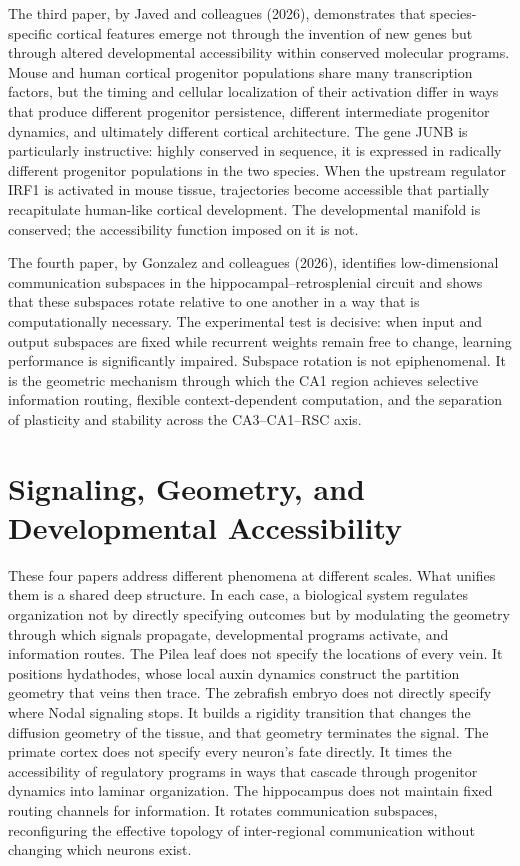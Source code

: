 \documentclass[12pt, a4paper, openany]{book}
\theoremstyle{definition}
\theoremstyle{remark}
\begin{document}
The third paper, by Javed and colleagues (2026), demonstrates that species-specific cortical features emerge not through the invention of new genes but through altered developmental accessibility within conserved molecular programs. Mouse and human cortical progenitor populations share many transcription factors, but the timing and cellular localization of their activation differ in ways that produce different progenitor persistence, different intermediate progenitor dynamics, and ultimately different cortical architecture. The gene JUNB is particularly instructive: highly conserved in sequence, it is expressed in radically different progenitor populations in the two species. When the upstream regulator IRF1 is activated in mouse tissue, trajectories become accessible that partially recapitulate human-like cortical development. The developmental manifold is conserved; the accessibility function imposed on it is not.

The fourth paper, by Gonzalez and colleagues (2026), identifies low-dimensional communication subspaces in the hippocampal--retrosplenial circuit and shows that these subspaces rotate relative to one another in a way that is computationally necessary. The experimental test is decisive: when input and output subspaces are fixed while recurrent weights remain free to change, learning performance is significantly impaired. Subspace rotation is not epiphenomenal. It is the geometric mechanism through which the CA1 region achieves selective information routing, flexible context-dependent computation, and the separation of plasticity and stability across the CA3--CA1--RSC axis.

\section*{Signaling, Geometry, and Developmental Accessibility}

These four papers address different phenomena at different scales. What unifies them is a shared deep structure. In each case, a biological system regulates organization not by directly specifying outcomes but by modulating the geometry through which signals propagate, developmental programs activate, and information routes. The Pilea leaf does not specify the locations of every vein. It positions hydathodes, whose local auxin dynamics construct the partition geometry that veins then trace. The zebrafish embryo does not directly specify where Nodal signaling stops. It builds a rigidity transition that changes the diffusion geometry of the tissue, and that geometry terminates the signal. The primate cortex does not specify every neuron's fate directly. It times the accessibility of regulatory programs in ways that cascade through progenitor dynamics into laminar organization. The hippocampus does not maintain fixed routing channels for information. It rotates communication subspaces, reconfiguring the effective topology of inter-regional communication without changing which neurons exist.
\end{document}
